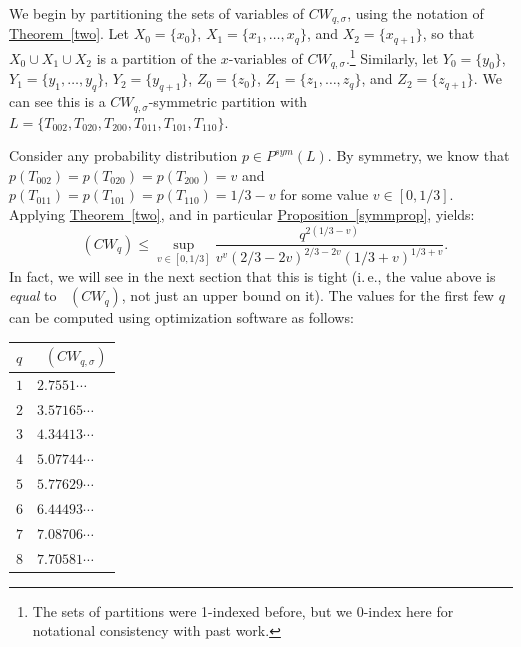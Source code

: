 \documentclass[11pt]{article}
\numberwithin{equation}{section}
\theoremstyle{definition}
\theoremstyle{plain}
\newcommand{\ie}{i.\,e.}
\newcommand{\expref}[2]{\hyperref[#2]{#1~\ref{#2}}}
\newcommand{\tsr}{\mathop{\tilde{\operatorname{S}}}}
\theoremstyle{definition}
\begin{document}
We begin by partitioning the  
%
sets of variables
of $CW_{q,\sigma}$, using the notation of \expref{Theorem}{two}. Let $X_0 = \{ x_0 \}$, $X_1 = \{ x_1, \ldots, x_q \}$, and $X_2 = \{ x_{q+1} \}$, so that $X_0 \cup X_1 \cup X_2$ is a partition of the $x$-variables of $CW_{q,\sigma}$.\footnote{The sets of partitions were 1-indexed before, but we 0-index here for notational consistency with past work.} Similarly, let $Y_0 = \{ y_0 \}$, $Y_1 = \{ y_1, \ldots, y_q \}$, $Y_2 = \{ y_{q+1} \}$, $Z_0 = \{ z_0 \}$, $Z_1 = \{ z_1, \ldots, z_q \}$, and $Z_2 = \{ z_{q+1} \}$. We can see this is a $CW_{q,\sigma}$-symmetric partition with $L = \{ T_{002}, T_{020}, T_{200}, T_{011}, T_{101}, T_{110} \}$. 

Consider any probability distribution $p \in P^{sym}(L)$. By symmetry, we know that $p(T_{002}) = p(T_{020}) = p(T_{200}) = v$ and $p(T_{011}) = p(T_{101}) = p(T_{110}) = 1/3 - v$ for some value $v \in [0,1/3]$. Applying \expref{Theorem}{two}, and in particular \expref{Proposition}{symmprop}, yields:
$$\tsr(CW_q) \leq \sup_{v \in [0,1/3]} \frac{q^{2(1/3 - v)}}{v^v (2/3 - 2v)^{2/3 - 2v} (1/3 + v)^{1/3+v}}.$$
In fact, we will see in the next section that this is tight (\ie, the value above is \emph{equal} to $\tsr(CW_q)$, not just an upper bound on it). The values for the first few $q$ can be computed using optimization software as follows:

\begin{center}
\begin{tabular}{l|l}
$q$ & $\tsr(CW_{q,\sigma})$ \\ \hline
$1$                                & $2.7551\cdots$                                                        \\
$2$                                & $3.57165\cdots$                                                        \\
$3$                                & $4.34413\cdots$                                                        \\
$4$                                & $5.07744\cdots$                                                        \\
$5$                                & $5.77629\cdots$                                                           \\
$6$                                & $6.44493\cdots$                                                       \\
$7$                                & $7.08706\cdots$                                                       \\
$8$                                & $7.70581\cdots$                                                   
\end{tabular}
\end{center}
\end{document}
